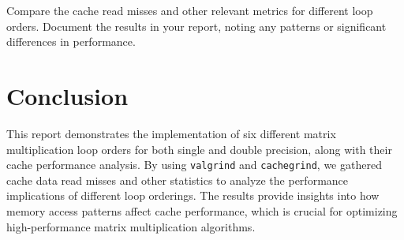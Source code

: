 \documentclass[12pt]{article}
\begin{document}
Compare the cache read misses and other relevant metrics for different loop orders. Document the results in your report, noting any patterns or significant differences in performance.

\section{Conclusion}

This report demonstrates the implementation of six different matrix multiplication loop orders for both single and double precision, along with their cache performance analysis. By using \texttt{valgrind} and \texttt{cachegrind}, we gathered cache data read misses and other statistics to analyze the performance implications of different loop orderings. The results provide insights into how memory access patterns affect cache performance, which is crucial for optimizing high-performance matrix multiplication algorithms.
\end{document}
